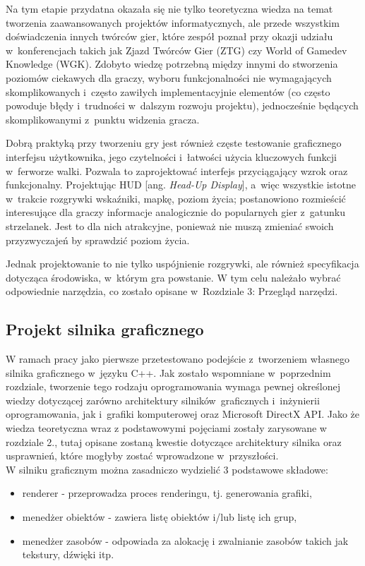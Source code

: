 Na tym etapie przydatna okazała się nie tylko teoretyczna wiedza na temat tworzenia zaawansowanych projektów informatycznych, ale przede wszystkim doświadczenia innych twórców gier, które zespół poznał przy okazji udziału w~konferencjach takich jak Zjazd Twórców Gier (ZTG) czy World of Gamedev Knowledge (WGK). Zdobyto wiedzę potrzebną między innymi do stworzenia poziomów ciekawych dla graczy, wyboru funkcjonalności nie wymagających skomplikowanych i~często zawiłych implementacyjnie elementów (co często powoduje błędy i~trudności w~dalszym rozwoju projektu), jednocześnie będących skomplikowanymi z~punktu widzenia gracza. 

Dobrą praktyką przy tworzeniu gry jest również częste testowanie graficznego interfejsu użytkownika, jego czytelności i~łatwości użycia kluczowych funkcji w~ferworze walki. Pozwala to zaprojektować interfejs przyciągający wzrok oraz funkcjonalny. Projektując HUD [ang. \emph{Head-Up Display}], a~więc wszystkie istotne w~trakcie rozgrywki wskaźniki, mapkę, poziom życia; postanowiono rozmieścić interesujące dla graczy informacje analogicznie do popularnych gier z~gatunku strzelanek. Jest to dla nich atrakcyjne, ponieważ nie muszą zmieniać swoich przyzwyczajeń by sprawdzić poziom życia. 

Jednak projektowanie to nie tylko uspójnienie rozgrywki, ale również specyfikacja dotycząca środowiska, w~którym gra powstanie. W tym celu należało wybrać odpowiednie narzędzia, co zostało opisane w~Rozdziale 3: Przegląd narzędzi. 

\subsection{Projekt silnika graficznego}

W ramach pracy jako pierwsze przetestowano podejście z~tworzeniem własnego silnika graficznego w~języku C++. Jak zostało wspomniane w~poprzednim rozdziale, tworzenie tego rodzaju oprogramowania wymaga pewnej określonej wiedzy dotyczącej zarówno architektury silników~graficznych i~inżynierii oprogramowania, jak i~grafiki komputerowej oraz Microsoft DirectX API. Jako że wiedza teoretyczna wraz z podstawowymi pojęciami zostały zarysowane w rozdziale 2., tutaj opisane zostaną kwestie dotyczące architektury silnika oraz usprawnień, które mogłyby zostać wprowadzone w~przyszłości.\\

W silniku graficznym można zasadniczo wydzielić 3 podstawowe składowe:
\begin{itemize}
\item renderer - przeprowadza proces renderingu, tj. generowania grafiki,
\item menedżer obiektów - zawiera listę obiektów i/lub listę ich grup,
\item menedżer zasobów - odpowiada za alokację i zwalnianie zasobów takich jak tekstury, dźwięki itp.
\end{itemize}

